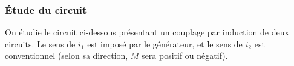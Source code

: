\documentclass[../../main/main.tex]{subfiles}
\begin{document}
\subsubsection{Étude du circuit}
\label{ssec:mutcpletude}
\noindent
\begin{minipage}[t]{.49\linewidth}
	On étudie le circuit ci-dessous présentant un couplage par induction de deux
	circuits. Le sens de $i_1$ est imposé par le générateur, et le sens de $i_2$
	est conventionnel (selon sa direction, $M$ sera positif ou négatif).
\end{minipage}
\hfill
\begin{minipage}[t]{.49\linewidth}
	~
	\vspace*{-40pt}
	\begin{center}
		\label{fig:cplmut_a}
	\end{center}
\end{minipage}
\smallbreak
\end{document}

